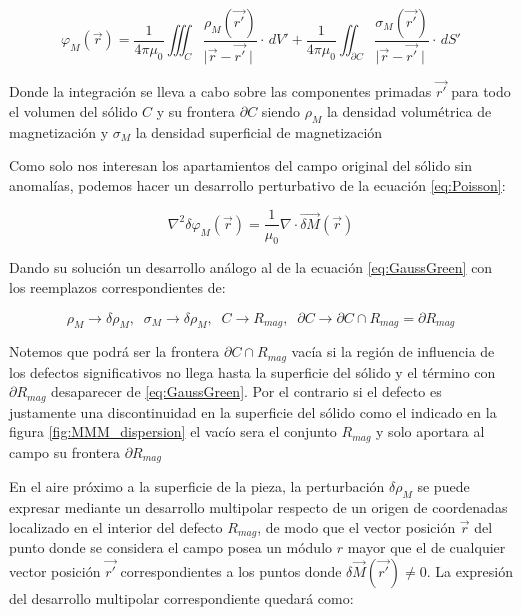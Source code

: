 \begin{equation}
	\label{eq:GaussGreen}
	\varphi_{M}(\vec{r}) = \dfrac{1}{4\pi\mu_{0}}\iiint_C \dfrac{\rho_{M}(\vec{r'})}{\mid\vec{r}-\vec{r'}\mid} \cdot \,dV' + 
	\dfrac{1}{4\pi\mu_{0}}\iint_{\partial C} \dfrac{\sigma_{M}(\vec{r'})}{\mid\vec{r}-\vec{r'}\mid} \cdot \,dS'
\end{equation}

Donde la integración se lleva a cabo sobre las componentes primadas $\vec{r'}$ para todo el volumen del sólido  $C$ y su frontera ${\partial C}$ siendo $\rho_{M}$ la densidad volumétrica de magnetización y $\sigma_{M}$ la densidad superficial de magnetización

Como solo nos interesan los apartamientos del campo original del sólido sin anomalías, podemos hacer un desarrollo perturbativo\citep{PerturbationMethod}\citep{SingularPerturbation} de la ecuación \ref{eq:Poisson}:



\begin{equation}
	\label{eq:PoissonPerturbada}
	\nabla^2\delta\varphi_{M}(\vec{r}) = \dfrac{1}{\mu_{0}} \nabla \cdot\vec{\delta M}(\vec{r}) 
\end{equation}

Dando su solución un desarrollo análogo al de la ecuación \ref{eq:GaussGreen} con los reemplazos correspondientes de:

\begin{equation}
	\label{eq:GaussGreenReemplazos}
	\rho_{M}   \rightarrow \delta\rho_{M},\;\;
	\sigma_{M} \rightarrow \delta\rho_{M},\;\;	  
	C \rightarrow R_{mag}, \;\;	  
	\partial C \rightarrow \partial C \cap R_{mag} = \partial R_{mag}
\end{equation}

Notemos que podrá ser la frontera $\partial C \cap R_{mag}$ vacía si la región de influencia de los defectos significativos no llega hasta la superficie del sólido y el término con $\partial R_{mag}$ desaparecer de \ref{eq:GaussGreen}. Por el contrario si el defecto es justamente una discontinuidad en la superficie del sólido como el indicado en la figura \ref{fig:MMM_dispersion} el vacío sera el conjunto $R_{mag}$ y solo aportara al campo su frontera $\partial R_{mag}$

En el aire próximo a la superficie de la pieza, la perturbación $\delta\rho_{M}$ se puede expresar mediante un desarrollo multipolar respecto de un origen de coordenadas localizado en el interior del defecto $R_{mag}$, de modo que el vector posición $\vec{r}$ del punto donde se considera el campo posea un módulo $r$ mayor que el de cualquier vector posición $\vec{r'}$ correspondientes a los puntos donde $\delta \vec{M}(\vec{r'}) \neq 0$. La expresión del desarrollo multipolar correspondiente quedará como:

